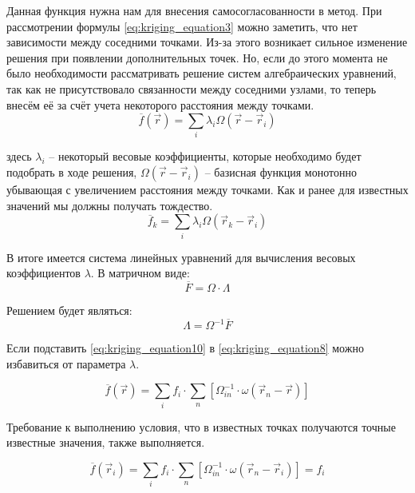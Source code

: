Данная функция нужна нам для внесения самосогласованности в метод. При рассмотрении формулы \eqref{eq:kriging_equation3} можно заметить, что нет зависимости между соседними точками. Из-за этого возникает сильное изменение решения при появлении дополнительных точек. Но, если до этого момента не было необходимости рассматривать решение систем алгебраических уравнений, так как не присутствовало связанности между соседними узлами, то теперь внесём её за счёт учета некоторого расстояния между точками.
\begin{equation}
  \label{eq:kriging_equation7}
  \overline{f}(\vec r) = \sum_i \lambda_i \Omega(\vec r - \vec r_i)
\end{equation}

здесь $\lambda_i$ -- некоторый весовые коэффициенты, которые необходимо будет подобрать в ходе решения, $\Omega(\vec r - \vec r_i)$ -- базисная функция монотонно убывающая с увеличением расстояния между точками. Как и ранее для известных значений мы должны получать тождество.
\begin{equation}
  \label{eq:kriging_equation8}
  \overline{f}_k = \sum_i \lambda_i \Omega(\vec r_k - \vec r_i)
\end{equation}

В итоге имеется система линейных уравнений для вычисления весовых коэффициентов $\lambda$. В матричном виде:
\begin{equation}
  \label{eq:kriging_equation9}
  \overline{F} = \Omega \cdot \Lambda 
\end{equation}

Решением будет являться:
\begin{equation}
  \label{eq:kriging_equation10}
  \Lambda = \Omega^{-1} \overline{F}
\end{equation}

Если подставить \eqref{eq:kriging_equation10} в \eqref{eq:kriging_equation8} можно избавиться от параметра $\lambda$.

\begin{equation}
  \overline{f}(\vec r) = \sum_i f_i \cdot \sum_n \left[ \Omega^{-1}_{in} \cdot \omega(\vec r_n - \vec r) \right] 
\end{equation}

Требование к выполнению условия, что в известных точках получаются точные известные значения, также выполняется. 

\begin{equation}
  \overline{f}(\vec r_i) = \sum_i f_i \cdot \sum_n \left[ \Omega^{-1}_{in} \cdot \omega(\vec r_n - \vec r_i) \right] = f_i 
\end{equation}


